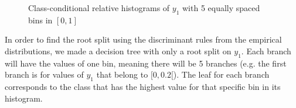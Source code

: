 \documentclass[12pt]{article}
\begin{document}
\begin{enumerate}[leftmargin=\labelsep]
    \begin{figure}[H]
        \centering
        \hfill
        \par
        \caption{Class-conditional relative histograms of $y_1$ with 5 equally spaced bins in $[0,1]$}
        \label{fig:class-conditional-y1}
    \end{figure}

    In order to find the root split using the discriminant rules from the empirical distributions, we made a decision tree with only a root split on $y_1$.
    Each branch will have the values of one bin, meaning there will be 5 branches (e.g. the first branch is for values of $y_1$ that belong to $[0,0.2[$).
    The leaf for each branch corresponds to the class that has the highest value for that specific bin in its histogram.


\end{enumerate}
\end{document}
